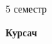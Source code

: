\documentclass{article}
\begin{document}
    \thispagestyle{empty}
    
    \begin{center}
        \Large 5 семестр
    \end{center}
    
    \vspace{6cm}
    
    \begin{center}
        \Huge {\textbf{Курсач}}
    \end{center}
    
    \vspace*{\fill}
    
    \clearpage
    
    \newpage
\end{document}
